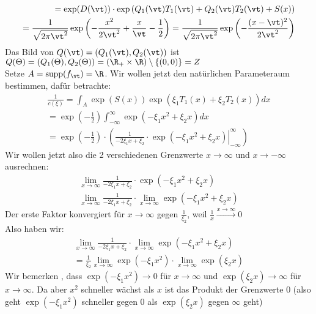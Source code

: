 \documentclass[12pt]{article}
\begin{document}
\begin{description}
{\begin{align*}
                    =\exp(D(\vt))\cdot \exp\left(Q_1(\vt)T_1(\vt)+Q_2(\vt)T_2(\vt)+S(x)\right) \\
                    =\frac{1}{\sqrt{2\pi\vt^2}}\exp\left(-\frac{x^2}{2\vt^2}+\frac{x}{\vt}-\frac{1}{2}\right) 
                    = \frac{1}{\sqrt{2\pi\vt^2}}\exp\left(-\frac{(x-\vt)^2}{2\vt^2}\right)
                \end{align*}
                Das Bild von $Q(\vt)=(Q_1(\vt),Q_2(\vt))$ ist $Q(\Theta)=(Q_1(\Theta),Q_2(\Theta))=(\R_{+}\times\R)\setminus\{(0,0)\}=Z$
                \\Setze $A=\text{supp}(f_{\vt})=\R$. Wir wollen jetzt den natürlichen Parameteraum bestimmen, dafür betrachte:
                \begin{align*}
                    \frac{1}{c(\xi)}=\int_{A}\exp(S(x))\exp(\xi_1T_1(x)+\xi_2T_2(x))dx \\
                    =\exp\left(-\frac{1}{2}\right)\int_{-\infty}^{\infty}\exp(-\xi_1x^2+\xi_2 x)dx \\
                    =\exp\left(-\frac{1}{2}\right)\cdot \left(\left.\frac{1}{-2\xi_1x+\xi_2}\cdot\exp(-\xi_1x^2+\xi_2 x)\right|_{-\infty}^{\infty}\right) 
                \end{align*}
                Wir wollen jetzt also die 2 verschiedenen Grenzwerte $x\to\infty$ und $x\to-\infty$ ausrechnen:
                \begin{align*}
                    \lim_{x\to\infty}\frac{1}{-2\xi_1x+\xi_2}\cdot\exp(-\xi_1x^2+\xi_2 x) \\
                    \lim_{x\to\infty}\frac{1}{-2\xi_1x+\xi_2}\cdot \lim_{x\to\infty}\exp(-\xi_1x^2+\xi_2x)
                \end{align*}
                Der erste Faktor konvergiert für $x\to\infty$ gegen $\frac{1}{\xi_2}$, weil $\frac{1}{x}\xrightarrow{x\to\infty}0$
                \\ Also haben wir:
                \begin{align*}
                    \lim_{x\to\infty}\frac{1}{-2\xi_1x+\xi_2}\cdot \lim_{x\to\infty}\exp(-\xi_1x^2+\xi_2x) \\
                    =\frac{1}{\xi_2}\lim_{x\to\infty}\exp(-\xi_1x^2) \cdot \lim_{x\to\infty}\exp(\xi_2x)
                \end{align*}
                Wir bemerken , dass $\exp(-\xi_1x^2)\to 0$ für $x\to \infty$ und $\exp(\xi_2x)\to \infty$ für $x\to\infty$. Da aber $x^2$ schneller wächst als $x$ ist das Produkt der Grenzwerte $0$ (also geht $\exp(-\xi_1x^2)$ schneller gegen $0$ als $\exp(\xi_2x)$ gegen $\infty$ geht)
}
\end{description}
\end{document}
